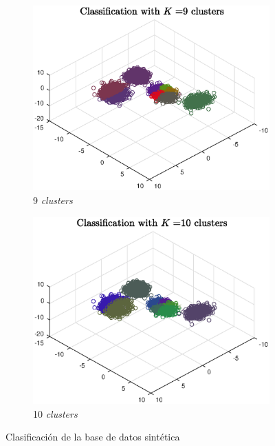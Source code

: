 \documentclass[11pt]{article} %
\begin{document}
\begin{figure}
\begin{subfigure}[b]{0.3\textwidth}
        \includegraphics[width=\textwidth]{../src/fig/21_9_clusters.eps}
        \caption[]{9 \emph{clusters}}
        \label{fig:21:9c}
    \end{subfigure}
    \quad
    \begin{subfigure}[b]{0.3\textwidth}
        \includegraphics[width=\textwidth]{../src/fig/21_10_clusters.eps}
        \caption[]{10 \emph{clusters}}
        \label{fig:21:10c}
    \end{subfigure}
    \caption{Clasificación de la base de datos sintética}
    \label{fig:21:clusters}
\end{figure}
\end{document}
